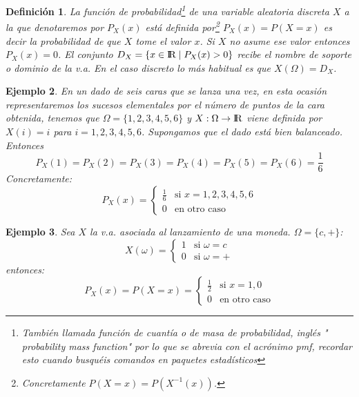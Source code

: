 \documentclass[12pt]{report}
\newtheorem{definition}{Definici\'on}
\newtheorem{example}[definition]{Ejemplo}
\begin{document}
\begin{definition}
La \emph{función de probabilidad}\footnote{También llamada función de cuantía o de masa
 de probabilidad,  inglés "\emph{ probability mass function}" por lo que se
 abrevia con el acrónimo \emph{pmf}, recordar esto cuando busquéis comandos en paquetes
estadísticos} de una variable aleatoria discreta $X$ a la que denotaremos por $P_{X}(x)$
está definida por\footnote{ Concretamente $P(X=x)=P(X^{-1}(x))$.}  $P_{X}(x)=P(X=x)$ es
decir la probabilidad de que $X$ tome el valor $x$. Si $X$ no asume ese valor entonces
$P_{X}(x)=0$. El conjunto $D_X=\{ x\in\mbox{I\kern-.2em\hbox{R}} \mid P_X(x)>0\}$ recibe el nombre de soporte o
dominio de la v.a. En el caso discreto lo más habitual es que $X(\Omega)=D_X$.
\end{definition}


\begin{example}
  En un dado de seis caras que se lanza una vez, en esta ocasión representaremos los
   sucesos elementales por el número de puntos de la cara obtenida,  tenemos que
  $\Omega=\{1,2,3,4,5,6\}$ y $X:\Omega\to \mbox{I\kern-.2em\hbox{R}}$ viene definida
  por  $X(i)=i$ para $i=1,2,3,4,5,6$. Supongamos que el dado está
  bien balanceado. Entonces
  $$P_{X}(1)=P_{X}(2)=P_{X}(3)=P_{X}(4)=P_{X}(5)=P_{X}(6)=\frac{1}{6}$$
  Concretamente:
  $$
  P_{X}(x)=
  \left\{
  \begin{array}{ll}
   \frac{1}{6} & \mbox{si } x=1,2,3,4,5,6\\
  0 & \mbox{en otro caso }
  \end{array}
  \right.
  $$
\end{example}

\begin{example}
 Sea $X$ la v.a. asociada al lanzamiento de una moneda. $\Omega=\{c,+\}$:
 $$X(\omega)=\left\{\begin{array}{ll} 1 & \mbox{si } \omega=c \\
0 & \mbox{si }\omega=+\end{array}\right.$$
 entonces:
$$P_{X}(x)=P(X=x)=\left\{\begin{array}{ll} \frac{1}{2} & \mbox{si } x=1,0\\
0 & \mbox{en otro caso}\end{array}\right.$$
\end{example}
\end{document}
